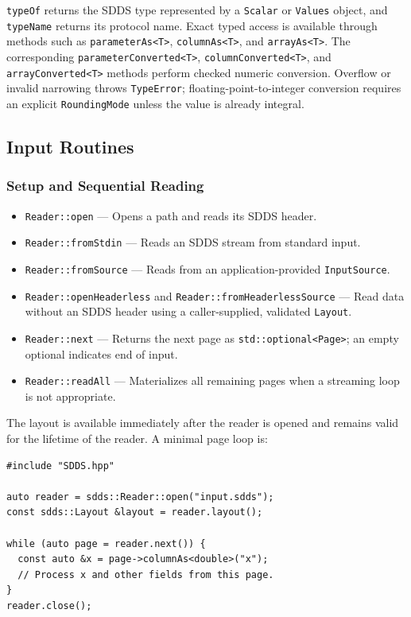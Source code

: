 \documentclass[11pt]{article}
\begin{document}
{\tt typeOf} returns the SDDS type represented by a {\tt Scalar} or
{\tt Values} object, and {\tt typeName} returns its protocol name.  Exact typed
access is available through methods such as {\tt parameterAs<T>},
{\tt columnAs<T>}, and {\tt arrayAs<T>}.  The corresponding
{\tt parameterConverted<T>}, {\tt columnConverted<T>}, and
{\tt arrayConverted<T>} methods perform checked numeric conversion.  Overflow
or invalid narrowing throws {\tt TypeError}; floating-point-to-integer
conversion requires an explicit {\tt RoundingMode} unless the value is already
integral.

\subsection{Input Routines}

\subsubsection{Setup and Sequential Reading}

\begin{itemize}
\item {\tt Reader::open} --- Opens a path and reads its SDDS header.
\item {\tt Reader::fromStdin} --- Reads an SDDS stream from standard input.
\item {\tt Reader::fromSource} --- Reads from an application-provided
{\tt InputSource}.
\item {\tt Reader::openHeaderless} and
{\tt Reader::fromHeaderlessSource} --- Read data without an SDDS header using a
caller-supplied, validated {\tt Layout}.
\item {\tt Reader::next} --- Returns the next page as
{\tt std::optional<Page>}; an empty optional indicates end of input.
\item {\tt Reader::readAll} --- Materializes all remaining pages when a
streaming loop is not appropriate.
\end{itemize}

The layout is available immediately after the reader is opened and remains
valid for the lifetime of the reader.  A minimal page loop is:

\begin{verbatim}
#include "SDDS.hpp"

auto reader = sdds::Reader::open("input.sdds");
const sdds::Layout &layout = reader.layout();

while (auto page = reader.next()) {
  const auto &x = page->columnAs<double>("x");
  // Process x and other fields from this page.
}
reader.close();
\end{verbatim}
\end{document}
